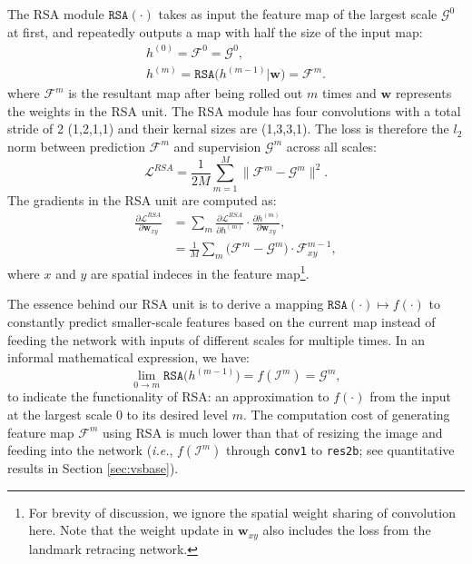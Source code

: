 \documentclass[10pt,twocolumn,letterpaper]{article}
\begin{document}
The RSA module $\texttt{RSA}(\cdot)$ takes as input the feature map of the largest scale $\mathcal{G} ^ 0$ at first,  and repeatedly outputs a map with half the size of the input map:
\begin{gather}
	h^{(0)} = \mathcal{F} ^ 0 = \mathcal{G} ^ 0, \nonumber \\
	h^{(m)} = \texttt{RSA} \big(h^{(m-1)} | \bm{w}   \big) = \mathcal{F}^m. \label{rsa}
\end{gather}
where $\mathcal{F}^m$ is the resultant map after being rolled out $m$ times and $\bm{w}$ represents the weights in the RSA unit.
The RSA module has four convolutions with a total stride of 2 (1,2,1,1) and their kernal sizes are (1,3,3,1). The loss is therefore the $l_2$ norm between prediction $\mathcal{F}^m$ and supervision $\mathcal{G} ^ m$ across all scales:
\begin{equation}
   \mathcal{L}^{RSA} = \frac{1}{2M} \sum_{m=1}^{M}  \big\| \mathcal{F}^m - \mathcal{G} ^ m  \big\|^2.
\end{equation}
The gradients in the RSA unit are computed as:
\begin{align}
    \frac{\partial \mathcal{L}^{RSA}}{\partial \bm{w}_{xy}} & = \sum_{m}  \frac{\partial \mathcal{L}^{RSA}}{\partial h^{(m)}} \cdot \frac{\partial h^{(m)}}{\partial \bm{w}_{xy}}, \nonumber\\
    & = \frac{1}{M} \sum_{m}  \big( \mathcal{F}^m - \mathcal{G} ^ m  \big) \cdot \mathcal{F}^{m-1}_{xy}, 
\end{align}
where $x$ and $y$ are spatial  indeces in the feature map\footnote{For brevity of discussion, we ignore the spatial weight sharing of convolution here. Note that the weight update in $\bm{w}_{xy}$ also includes the loss from the landmark retracing network. }.

The essence behind our RSA unit is to derive a mapping $\texttt{RSA} (\cdot)  \mapsto  f(\cdot)$ to constantly predict smaller-scale features based on the current map instead of feeding the network with inputs of different scales for multiple times. In an informal mathematical expression, we have:
\begin{equation}
\lim_{0 \rightarrow m } \texttt{RSA} \big(h^{(m-1)} \big)  = f( \mathcal{I} ^m ) = \mathcal{G}^m, \nonumber
\end{equation}
to indicate the functionality of RSA: an approximation to $f(\cdot)$ from the input at the largest scale 0 to its desired level $m$.
The computation cost of generating  feature map $\mathcal{F}^m$ %
using RSA is much lower than that of resizing the image and feeding into the network (\textit{i.e.},  $ f( \mathcal{I} ^m )$ through \texttt{conv1} to \texttt{res2b}; see quantitative results in Section \ref{sec:vsbase}).
\end{document}
